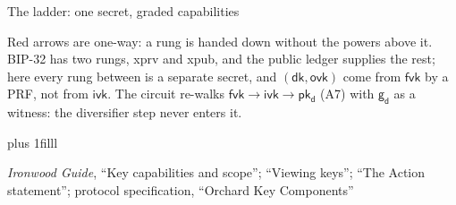 \documentclass[aspectratio=169,11pt]{beamer}
\newcommand{\gd}{\ensuremath{\mathsf{g_d}}}
\newcommand{\pkd}{\ensuremath{\mathsf{pk_d}}}
\newcommand{\ivk}{\ensuremath{\mathsf{ivk}}}
\newcommand{\fvk}{\ensuremath{\mathsf{fvk}}}
\newcommand{\ovk}{\ensuremath{\mathsf{ovk}}}
\newcommand{\dk}{\ensuremath{\mathsf{dk}}}
\newcommand{\src}[1]{\par\vskip0pt plus 1filll
  {\fontsize{6}{7.2}\selectfont\color{arbdim}\raggedright #1\par}}
\begin{document}
\begin{frame}{The ladder: one secret, graded capabilities}
\centering
\LadderFig
\par\smallskip
\begin{flushleft}\small
Red arrows are one-way: a rung is handed down without the powers above
it. BIP-32 has two rungs, xprv and xpub, and the public ledger supplies
the rest; here every rung between is a separate secret, and $(\dk, \ovk)$
come from \fvk{} by a PRF, not from \ivk. The circuit re-walks
$\fvk \to \ivk \to \pkd$ (A7) with \gd{} as a witness: the diversifier
step never enters it.
\end{flushleft}
\src{\emph{Ironwood Guide}, ``Key capabilities and scope''; ``Viewing keys'';
``The Action statement''; protocol specification, ``Orchard Key
Components''}
\end{frame}
\end{document}
